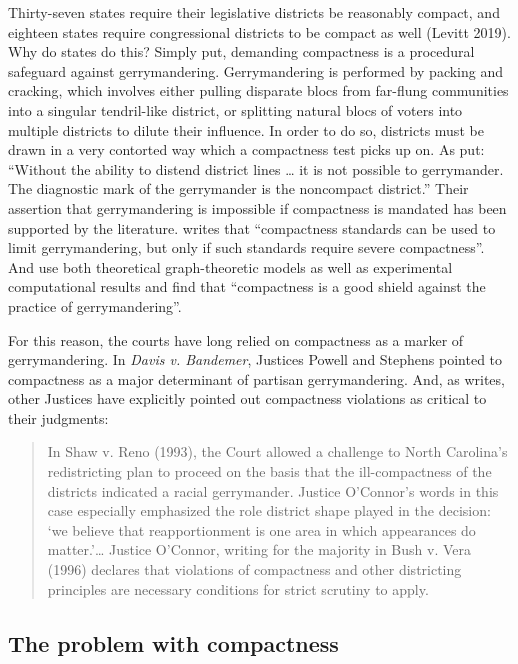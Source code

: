 \documentclass[]{article}
\begin{document}
Thirty-seven states require their legislative districts be reasonably
compact, and eighteen states require congressional districts to be
compact as well (Levitt 2019). Why do states do this? Simply put,
demanding compactness is a procedural safeguard against gerrymandering.
Gerrymandering is performed by packing and cracking, which involves
either pulling disparate blocs from far-flung communities into a
singular tendril-like district, or splitting natural blocs of voters
into multiple districts to dilute their influence. In order to do so,
districts must be drawn in a very contorted way which a compactness test
picks up on. As \cite{pp1991} put: ``Without the ability to distend
district lines \ldots{} it is not possible to gerrymander. The
diagnostic mark of the gerrymander is the noncompact district.'' Their
assertion that gerrymandering is impossible if compactness is mandated
has been supported by the literature. \cite{altman1998} writes that
``compactness standards can be used to limit gerrymandering, but only if
such standards require severe compactness''. And \cite{apollonio2006}
use both theoretical graph-theoretic models as well as experimental
computational results and find that ``compactness is a good shield
against the practice of gerrymandering''.

For this reason, the courts have long relied on compactness as a marker
of gerrymandering. In \emph{Davis v. Bandemer}, Justices Powell and
Stephens pointed to compactness as a major determinant of partisan
gerrymandering. And, as \cite{altman1998} writes, other Justices have
explicitly pointed out compactness violations as critical to their
judgments:

\begin{quote}
In Shaw v. Reno (1993), the Court allowed a challenge to North
Carolina's redistricting plan to proceed on the basis that the
ill-compactness of the districts indicated a racial gerrymander. Justice
O'Connor's words in this case especially emphasized the role district
shape played in the decision: `we believe that reapportionment is one
area in which appearances do matter.'\ldots{} Justice O'Connor, writing
for the majority in Bush v. Vera (1996) declares that violations of
compactness and other districting principles are necessary conditions
for strict scrutiny to apply.
\end{quote}

\hypertarget{the-problem-with-compactness}{%
\subsection{The problem with
compactness}\label{the-problem-with-compactness}}
\end{document}
